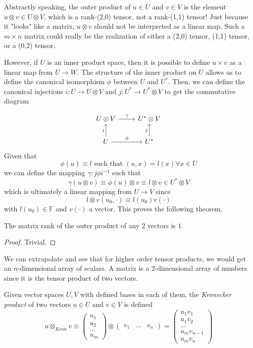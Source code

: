 \documentclass{article}
\begin{document}
    Abstractly speaking, the outer product of $u \in U$ and $v \in V$ is the element $u \otimes v \in U \otimes V$, which is a rank-(2,0) tensor, not a rank-(1,1) tensor! Just because it "looks" like a matrix, $u \otimes v$ should not be interpreted as a linear map. Such a $m \times n$ matrix could really be the realization of either a (2,0) tensor, (1,1) tensor, or a (0,2) tensor. 

    However, if $U$ is an inner product space, then it is possible to define $u \times v$ as a linear map from $U \longrightarrow W$. The structure of the inner product on $U$ allows us to define the canonical isomorphism $\phi$ between $U$ and $U^*$. Then, we can define the canonical injections $i: U \longrightarrow U \otimes V$ and $j: U^* \longrightarrow U^* \otimes V$ to get the commutative diagram 

    \[\begin{tikzcd}
        U \otimes V \arrow{r}{\gamma} & U^* \otimes V \\
        U \arrow{u}{i} \arrow{r}{\phi} & U^* \arrow{u}{j}
    \end{tikzcd}\]
    Given that 
    \[\phi(u) \equiv l \text{ such that } (u, x) = l(x) \forall x \in U\]
    we can define the mapping $\gamma: j \phi i^{-1}$ such that 
    \[\gamma (u \otimes v) \equiv \phi(u) \otimes v \equiv l \otimes v \in U^* \otimes V\]
    which is ultimately a linear mapping from $U \longrightarrow V$ since
    \[l \otimes v (u_0, \cdot) \equiv l(u_0) v(\cdot)\]
    with $l(u_0) \in \mathbb{F}$ and $v(\cdot)$ a vector. This proves the following theorem. 

    \begin{proposition}
    The matrix rank of the outer product of any 2 vectors is $1$. 
    \end{proposition}
    \begin{proof}
    Trivial.
    \end{proof}

    We can extrapolate and see that for higher order tensor products, we would get an $n$-dimensional array of scalars. A matrix is a $2$-dimensional array of numbers since it is the tensor product of two vectors. 

    \begin{definition}
    Given vector spaces $U, V$ with defined bases in each of them, the \textit{Kronecker product} of two vectors $u \in U$ and $v \in V$ is defined
    \[u \otimes_{Kron} v \equiv \begin{pmatrix}
    u_1 \\ u_2 \\ ... \\ u_m
    \end{pmatrix} \otimes \begin{pmatrix}
    v_1 & ... & v_n
    \end{pmatrix} = \begin{pmatrix}
    u_1 v_1 \\ u_1 v_2 \\ ... \\ u_m v_{n-1} \\ u_m v_n 
    \end{pmatrix}\]
    \end{definition}
\end{document}
